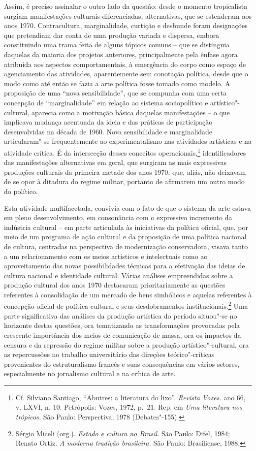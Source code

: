 Assim, é preciso assinalar o outro lado da questão: desde o momento
tropicalista surgiam manifestações culturais diferenciadas,
alternativas, que se estenderam aos anos 1970. Contracultura,
marginalidade, curtição e desbunde foram designações que pretendiam dar
conta de uma produção variada e dispersa, embora constituindo uma trama
feita de alguns tópicos comuns -- que se distinguia daquelas da maioria
dos projetos anteriores, principalmente pela ênfase agora atribuída aos
aspectos comportamentais, à emergência do corpo como espaço de
agenciamento das atividades, aparentemente sem conotação política, desde
que o modo como até então se fazia a arte política fosse tomado como
modelo. A proposição de uma ``nova sensibilidade'', que se compunha com
uma certa concepção de ``marginalidade'' em relação ao sistema
sociopolítico e artístico"-cultural, aparecia como a motivação básica
daquelas manifestações -- o que implicava mudança acentuada da ideia e
das práticas de participação desenvolvidas na década de 1960. Nova
sensibilidade e marginalidade articularam"-se frequentemente ao
experimentalismo nas atividades artísticas e na atividade crítica. É da
intersecção desses conceitos operacionais,\footnote{Cf. Silviano
  Santiago, ``Abutres: a literatura do lixo''. \emph{Revista Vozes.}
  ano 66, v. \textsc{LXVI}, n. 10. Petrópolis: Vozes, 1972, p.~21. Rep. em
  \emph{Uma literatura nos trópicos.} São Paulo: Perspectiva, 1978
  (Debates"-155).} identificadores das manifestações alternativas em
geral, que surgiram as mais expressivas produções culturais da primeira
metade dos anos 1970, que, aliás, não deixavam de se opor à ditadura do
regime militar, portanto de afirmarem um outro modo do político.

Esta atividade multifacetada, convivia com o fato de que o sistema da
arte estava em pleno desenvolvimento, em consonância com o expressivo
incremento da indústria cultural -- em parte articulada às iniciativas
da política oficial, que, por meio de um programa de ação cultural e da
proposição de uma política nacional de cultura, centradas na perspectiva
de modernização conservadora, visava tanto a um relacionamento com os
meios artísticos e intelectuais como ao aproveitamento das novas
possibilidades técnicas para a efetivação das ideias de cultura nacional
e identidade cultural. Várias análises empreendidas sobre a produção
cultural dos anos 1970 destacaram prioritariamente as questões
referentes à consolidação de um mercado de bens simbólicos e aquelas
referentes à concepção oficial de política cultural e seus
desdobramentos institucionais.\footnote{Sérgio Miceli (org.).
  \emph{Estado e cultura no Brasil.} São Paulo: Difel, 1984; Renato
  Ortiz. \emph{A moderna tradição brasileira.} São Paulo: Brasiliense,
  1988.} Uma parte significativa das análises da produção artística do
período situou"-se no horizonte destas questões, ora tematizando as
transformações provocadas pela crescente importância dos meios de
comunicação de massa, ora os impactos da censura e da repressão do
regime militar sobre a produção artístico"-cultural, ora as repercussões
no trabalho universitário das direções teórico"-críticas provenientes do
estruturalismo francês e suas consequências em vários setores,
especialmente no jornalismo cultural e na crítica de arte.

